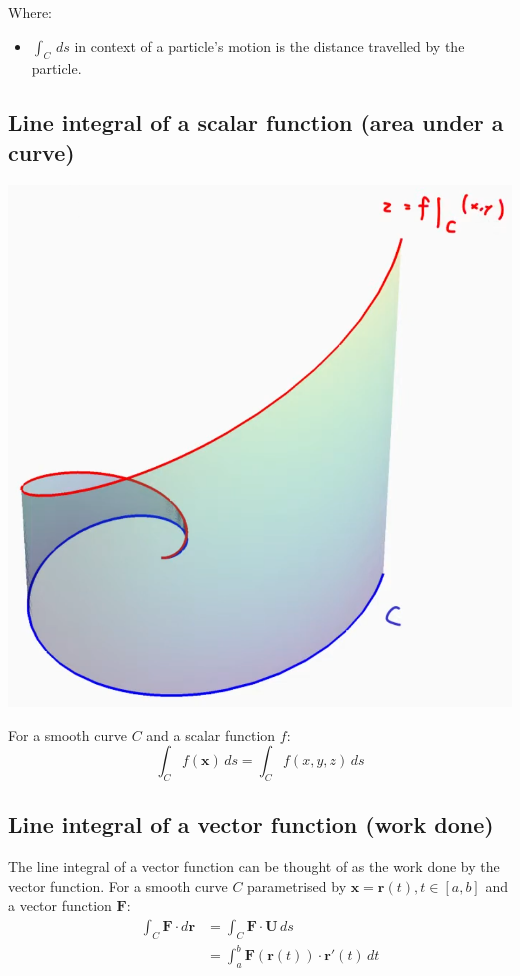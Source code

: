 \documentclass[11pt]{article}
\begin{document}
Where:
\begin{itemize}
\item \(\int_C \, ds\) in context of a particle's motion is the distance travelled by the particle.
\end{itemize}

\subsection{Line integral of a scalar function (area under a curve)}
\label{sec:org94700ab}
\begin{center}
\includegraphics[width=.9\linewidth]{./images/line-integral-of-a-scalar-function.png}
\end{center}
For a smooth curve \(C\) and a scalar function \(f\):
\[\int_C f(\boldsymbol{x}) \, ds = \int_C f(x, y, z) \, ds\]

 \newpage

\subsection{Line integral of a vector function (work done)}
\label{sec:orgffa09c4}
The line integral of a vector function can be thought of as the work done by the vector function.
For a smooth curve \(C\) parametrised by \(\boldsymbol{x} = \boldsymbol{r} (t), t \in [a, b]\) and a vector function \(\boldsymbol{F}\):
\begin{align*}
\int_C \boldsymbol{F} \cdot d \boldsymbol{r} &= \int_C \boldsymbol{F} \cdot \boldsymbol{U} \, ds \\
&= \int_a^b \boldsymbol{F} (\boldsymbol{r} (t)) \cdot \boldsymbol{r'} (t) \, dt
\end{align*}
\end{document}
